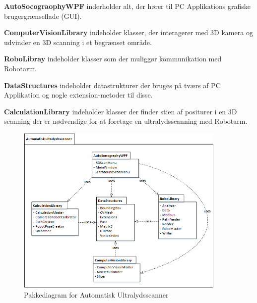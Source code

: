 \textbf{AutoSocograophyWPF} inderholder alt, der hører til PC Applikations grafiske brugergrænseflade (GUI).

\textbf{ComputerVisionLibrary} indeholder klasser, der interagerer med 3D kamera og udvinder en 3D scanning i et begrænset område.

\textbf{RoboLibray} indeholder klasser som der muliggør kommunikation med Robotarm. 

\textbf{DataStructures} indeholder datastrukturer der bruges på tværs af PC Applikation og nogle extension-metoder til disse. 

\textbf{CalculationLibrary} indeholder klasser der finder stien af positurer i en 3D scanning der er nødvendige for at foretage en ultralydsscanning med Robotarm.

\begin{figure}[H]
    \centering
    \includegraphics[width=0.9\textwidth]{figurer/d/Design/Pakkediagram}
    \caption{Pakkediagram for Automatisk Ultralydsscanner}
    \label{Pakkediagram}
\end{figure}
\newpage
